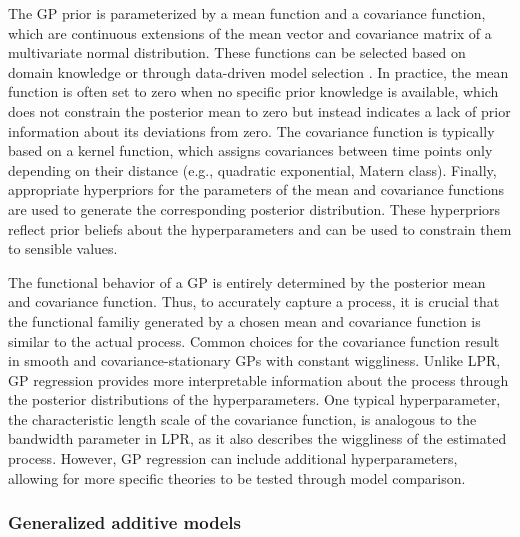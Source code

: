 \documentclass[man, floatsintext]{apa7}
\begin{document}
The GP prior is parameterized by a mean function and a covariance function,
which are continuous extensions of the mean vector and covariance matrix of a
multivariate normal distribution. These functions can be selected based on
domain knowledge or through data-driven model selection
\parencite{richardson_gaussian_2017, abdessalem_automatic_2017}. In practice,
the mean function is often set to zero when no specific prior knowledge is
available, which does not constrain the posterior mean to zero but instead
indicates a lack of prior information about its deviations from zero.
The covariance function is typically based on a kernel function, which assigns
covariances between time points only depending on their distance
(e.g., quadratic exponential, Matern class). Finally, appropriate hyperpriors
for the parameters of the mean and covariance functions are used to generate
the corresponding posterior distribution. These hyperpriors reflect
prior beliefs about the hyperparameters and can be used to constrain them to
sensible values.

The functional behavior of a GP is entirely determined by the posterior mean
and covariance function. Thus, to accurately capture a process, it is crucial
that the functional familiy generated by a chosen mean and covariance function
is similar to the actual process.
Common choices for the covariance function result in smooth and
covariance-stationary GPs with constant wiggliness. Unlike LPR, GP
regression provides more interpretable information about the process through
the posterior distributions of the hyperparameters.
One typical hyperparameter, the characteristic length scale of the covariance
function, is analogous to the bandwidth parameter in LPR, as it also describes
the wiggliness of the estimated process. However, GP regression can
include additional hyperparameters, allowing for more specific theories to be
tested through model comparison.

\subsubsection{Generalized additive models}
\end{document}
